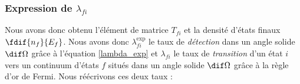 \subsubsection{Expression de $\lambda_{fi}$}


Nous avons donc obtenu l'élément de matrice $T_{fi}$ et la densité d'états finaux $ \fdif{n_f}{E_f}$. Nous avons donc $\lambda_{fi}^\text{exp}$ le taux de \textit{détection} dans un angle solide $\dif\Omega$ grâce à l'équation \eqref{lambda_exp} et $\lambda_{fi}$ le taux de \textit{transition} d'un état $i$ vers un continuum d'états $f$ situés dans un angle solide $\dif\Omega$ grâce à la règle d'or de Fermi. Nous réécrivons ces deux taux :

